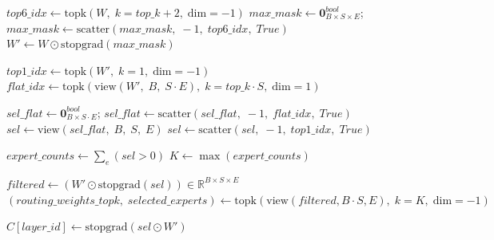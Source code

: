 \documentclass{article}
\begin{document}
\begin{algorithm}[H]
{    $top6\_idx \gets \mathrm{topk}(W,\; k=top\_k+2,\; \text{dim}=-1)$\;
    $max\_mask \gets \mathbf{0}_{B\times S\times E}^{bool}$; $max\_mask \gets \mathrm{scatter}(max\_mask,\; -1,\; top6\_idx,\; True)$\;
    $W' \gets W \odot \mathrm{stopgrad}(max\_mask)$\;

    $top1\_idx \gets \mathrm{topk}(W',\; k=1,\; \text{dim}=-1)$\;
    $flat\_idx \gets \mathrm{topk}(\mathrm{view}(W',\; B,\; S\!\cdot\!E),\; k=top\_k\cdot S,\; \text{dim}=1)$\;

    $sel\_flat \gets \mathbf{0}_{B\times S\cdot E}^{bool}$; $sel\_flat \gets \mathrm{scatter}(sel\_flat,\; -1,\; flat\_idx,\; True)$\;
    $sel \gets \mathrm{view}(sel\_flat,\; B,\; S,\; E)$\;
    $sel \gets \mathrm{scatter}(sel,\; -1,\; top1\_idx,\; True)$\;

    $expert\_counts \gets \sum\nolimits_{e} (sel > 0)$ 
    $K \gets \max(expert\_counts)$\;

    $filtered \gets (W' \odot \mathrm{stopgrad}(sel)) \in \mathbb{R}^{B\times S\times E}$\;
    $(routing\_weights\_topk,\; selected\_experts) \gets \mathrm{topk}(\mathrm{view}(filtered, B\cdot S, E),\; k=K,\; \text{dim}=-1)$\;

    $C[layer\_id] \gets \mathrm{stopgrad}(sel \odot W')$ 
}
\;
\end{algorithm}
\end{document}
